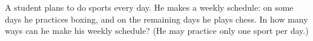 A student plans to do sports every day. He makes a weekly schedule: on some days he practices boxing, and on the remaining days he plays chess. In how many ways can he make his weekly schedule? (He may practice only one sport per day.)
